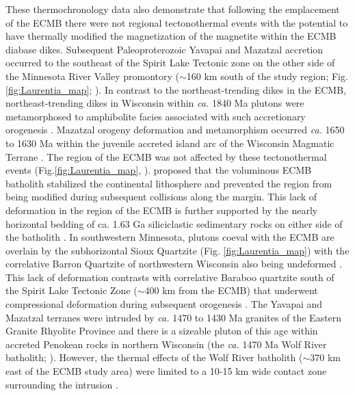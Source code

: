 \documentclass[draft]{agujournal2019}
\begin{document}
These thermochronology data also demonstrate that following the emplacement of the ECMB there were not regional tectonothermal events with the potential to have thermally modified the magnetization of the magnetite within the ECMB diabase dikes. Subsequent Paleoproterozoic Yavapai and Mazatzal accretion occurred to the southeast of the Spirit Lake Tectonic zone on the other side of the Minnesota River Valley promontory ($\sim$160 km south of the study region; Fig. \ref{fig:Laurentia_map}; ). In contrast to the northeast-trending dikes in the ECMB, northeast-trending dikes in Wisconsin within \textit{ca.} 1840 Ma plutons were metamorphosed to amphibolite facies associated with such accretionary orogenesis \cite{Holm2019a}. Mazatzal orogeny deformation and metamorphism occurred \textit{ca.} 1650 to 1630 Ma within the juvenile accreted island arc of the Wisconsin Magmatic Terrane \cite{Holm1998c}. The region of the ECMB was not affected by these tectonothermal events (Fig.\ref{fig:Laurentia_map}, ).  proposed that the voluminous ECMB batholith stabilized the continental lithosphere and prevented the region from being modified during subsequent collisions along the margin. This lack of deformation in the region of the ECMB is further supported by the nearly horizontal bedding of ca. 1.63 Ga siliciclastic sedimentary rocks on either side of the batholith \cite{Holm1998c, Medaris2021a}. In southwestern Minnesota, plutons coeval with the ECMB are overlain by the subhorizontal Sioux Quartzite (Fig. \ref{fig:Laurentia_map}) with the correlative Barron Quartzite of northwestern Wisconsin also being undeformed \cite{Southwick1986a}. This lack of deformation contrasts with correlative Baraboo quartzite south of the Spirit Lake Tectonic Zone ($\sim$400 km from the ECMB) that underwent compressional deformation during subsequent orogenesis \cite{Holm1998c,Medaris2021a}. The Yavapai and Mazatzal terranes were intruded by \textit{ca.} 1470 to 1430 Ma granites of the Eastern Granite Rhyolite Province and there is a sizeable pluton of this age within accreted Penokean rocks in northern Wisconsin (the \textit{ca.} 1470 Ma Wolf River batholith; ). However, the thermal effects of the Wolf River batholith ($\sim$370 km east of the ECMB study area) were limited to a 10-15 km wide contact zone surrounding the intrusion \cite{Holm2019a}. 
\end{document}
